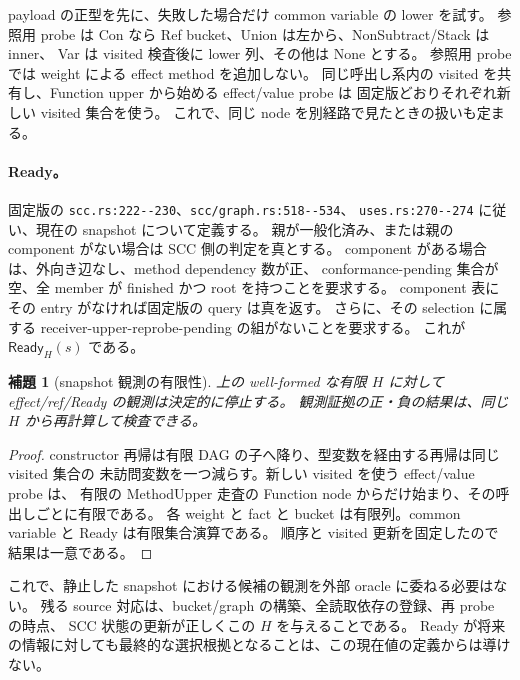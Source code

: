 \documentclass[11pt,a4paper]{article}
\newtheorem{lemma}[definition]{補題}
\begin{document}
payload の正型を先に、失敗した場合だけ common variable の lower を試す。
参照用 probe は Con なら Ref bucket、Union は左から、NonSubtract/Stack は inner、
Var は visited 検査後に lower 列、その他は None とする。
参照用 probe では weight による effect method を追加しない。
同じ呼出し系内の visited を共有し、Function upper から始める effect/value probe は
固定版どおりそれぞれ新しい visited 集合を使う。
これで、同じ node を別経路で見たときの扱いも定まる。

\paragraph{Ready。}
固定版の \nolinkurl{scc.rs:222--230}、\nolinkurl{scc/graph.rs:518--534}、
\nolinkurl{uses.rs:270--274} に従い、現在の snapshot について定義する。
親が一般化済み、または親の component がない場合は SCC 側の判定を真とする。
component がある場合は、外向き辺なし、method dependency 数が正、
conformance-pending 集合が空、全 member が finished かつ root を持つことを要求する。
component 表にその entry がなければ固定版の query は真を返す。
さらに、その selection に属する receiver-upper-reprobe-pending の組がないことを要求する。
これが \(\mathsf{Ready}_H(s)\) である。

\begin{lemma}[snapshot 観測の有限性]
上の well-formed な有限 \(H\) に対して effect/ref/Ready の観測は決定的に停止する。
観測証拠の正・負の結果は、同じ \(H\) から再計算して検査できる。
\end{lemma}
\begin{proof}
constructor 再帰は有限 DAG の子へ降り、型変数を経由する再帰は同じ visited 集合の
未訪問変数を一つ減らす。新しい visited を使う effect/value probe は、
有限の MethodUpper 走査の Function node からだけ始まり、その呼出しごとに有限である。
各 weight と fact と bucket は有限列。common variable と Ready は有限集合演算である。
順序と visited 更新を固定したので結果は一意である。
\end{proof}

これで、静止した snapshot における候補の観測を外部 oracle に委ねる必要はない。
残る source 対応は、bucket/graph の構築、全読取依存の登録、再 probe の時点、
SCC 状態の更新が正しくこの \(H\) を与えることである。
Ready が将来の情報に対しても最終的な選択根拠となることは、この現在値の定義からは導けない。
\end{document}
